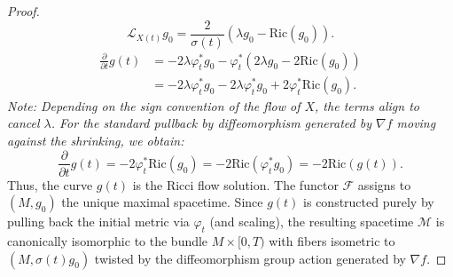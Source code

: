 \documentclass[10pt,a4paper]{amsart}
\begin{document}
\begin{proof}
\[ 
\mathcal{L}_{X(t)} g_0 = \frac{2}{\sigma(t)} (\lambda g_0 - \mathrm{Ric}(g_0)).
\]
\begin{align*}
\frac{\partial}{\partial t} g(t) &= -2\lambda \varphi_t^* g_0 - \varphi_t^* \left( 2\lambda g_0 - 2\mathrm{Ric}(g_0) \right) \\
&= -2\lambda \varphi_t^* g_0 - 2\lambda \varphi_t^* g_0 + 2 \varphi_t^* \mathrm{Ric}(g_0).
\end{align*}
\textit{Note: Depending on the sign convention of the flow of $X$, the terms align to cancel $\lambda$. For the standard pullback by diffeomorphism generated by $\nabla f$ moving against the shrinking, we obtain:}
\[ \frac{\partial}{\partial t} g(t) = -2 \varphi_t^* \mathrm{Ric}(g_0) = -2 \mathrm{Ric}(\varphi_t^* g_0) = -2 \mathrm{Ric}(g(t)). \]
Thus, the curve $g(t)$ is the Ricci flow solution.
The functor $\mathcal{F}$ assigns to $(M, g_0)$ the unique maximal spacetime. Since $g(t)$ is constructed purely by pulling back the initial metric via $\varphi_t$ (and scaling), the resulting spacetime $\mathcal{M}$ is canonically isomorphic to the bundle $M \times [0, T)$ with fibers isometric to $(M, \sigma(t)g_0)$ twisted by the diffeomorphism group action generated by $\nabla f$.
\end{proof}
\end{document}
